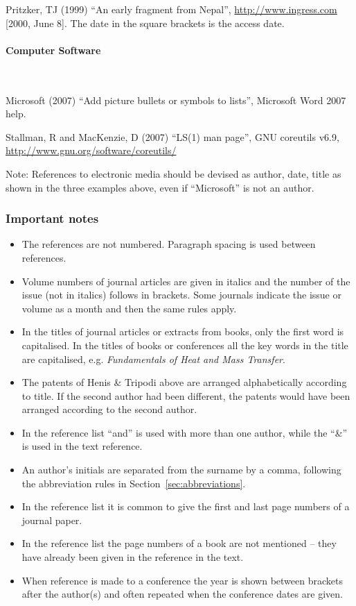 \documentclass[a5paper, 10pt]{article}
\begin{document}
Pritzker, TJ (1999) ``An early fragment from Nepal'',
  \url{http://www.ingress.com} [2000, June 8].  The date in the square brackets is the access date.

\paragraph{Computer Software}
\label{page:ref_compsoftware}
~

Microsoft (2007) ``Add picture bullets or symbols to lists'',
  Microsoft Word 2007 help.

Stallman, R and MacKenzie, D (2007) ``LS(1) man page'', GNU
  coreutils v6.9, \url{http://www.gnu.org/software/coreutils/}

Note: References to electronic media should be devised as author,
date, title as shown in the three examples above, even if
``Microsoft'' is not an author.

\subsubsection*{Important notes}

\begin{itemize}
\item The references are not numbered.  Paragraph spacing is used
  between references.
\item Volume numbers of journal articles are given in italics and the
  number of the issue (not in italics) follows in brackets.  Some
  journals indicate the issue or volume as a month and then the same
  rules apply.
\item In the titles of journal articles or extracts from books, only
  the first word is capitalised.  In the titles of books or
  conferences all the key words in the title are capitalised, e.g.
  \textit{Fundamentals of Heat and Mass Transfer}.
\item The patents of Henis \& Tripodi above are arranged
  alphabetically according to title.  If the second author had been
  different, the patents would have been arranged according to the
  second author.
\item In the reference list ``and'' is used with more than one author,
  while the ``\&'' is used in the text reference.
\item An author's initials are separated from the surname by a comma,
  following the abbreviation rules in Section~\ref{sec:abbreviations}.
\item In the reference list it is common to give the first and last
  page numbers of a journal paper.
\item In the reference list the page numbers of a book are not
  mentioned -- they have already been given in the reference in the
  text.
\item When reference is made to a conference the year is shown between
  brackets after the author(s) and often repeated when the conference
  dates are given.
\end{itemize}
\end{document}
